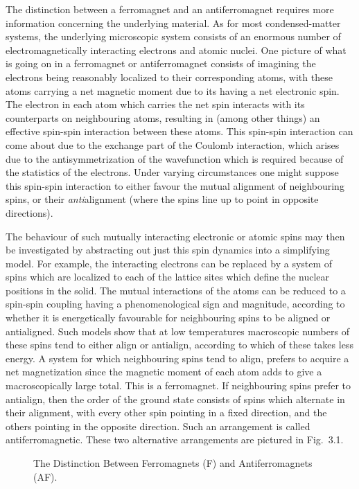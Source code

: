 The distinction between a ferromagnet and an
antiferromagnet requires more information concerning the
underlying material. As for most condensed-matter systems,
the underlying microscopic system consists of an enormous
number of electromagnetically interacting electrons and
atomic nuclei. One picture of what is going on in a
ferromagnet or antiferromagnet consists of imagining the
electrons being reasonably localized to their corresponding
atoms, with these atoms carrying a net magnetic moment due
to its having a net electronic spin. The electron in each
atom which carries the net spin interacts with its
counterparts on neighbouring atoms, resulting in (among
other things) an effective spin-spin interaction between
these atoms. This spin-spin interaction can come about due
to the exchange part of the Coulomb interaction, which
arises due to the antisymmetrization of the wavefunction
which is required because of the statistics of the
electrons. Under varying circumstances one might suppose
this spin-spin interaction to either favour the mutual
alignment of neighbouring spins, or their {\em
anti}alignment (where the spins line up to point in
opposite directions).

The behaviour of such mutually interacting electronic or
atomic spins may then be investigated by abstracting out
just this spin dynamics into a simplifying model. For
example, the interacting electrons can be replaced by a
system of spins which are localized to each of the lattice
sites which define the nuclear positions in the solid. The
mutual interactions of the atoms can be reduced to a
spin-spin coupling having a phenomenological sign and
magnitude, according to whether it is energetically
favourable for neighbouring spins to be aligned or
antialigned. Such models show that at low temperatures
macroscopic numbers of these spins tend to either align or
antialign, according to which of these takes less energy. A
system for which neighbouring spins tend to align, prefers
to acquire a net magnetization since the magnetic moment of
each atom adds to give a macroscopically large total. This
is a ferromagnet. If neighbouring spins prefer to
antialign, then the order of the ground state consists of
spins which alternate in their alignment, with every other
spin pointing in a fixed direction, and the others pointing
in the opposite direction. Such an arrangement is called
antiferromagnetic. These two alternative arrangements are
pictured in Fig.~3.1.


\begin{figure}
\vspace{1in}
\caption{The Distinction Between Ferromagnets (F) and
Antiferromagnets (AF).}
\end{figure}


